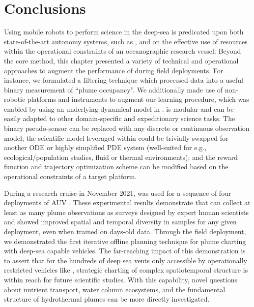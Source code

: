 \section{Conclusions}
\label{sec:field_conclusion}
Using mobile robots to perform science in the deep-sea is predicated upon both state-of-the-art autonomy systems, such as \PHORTEX, and on the effective use of resources within the operational constraints of an oceanographic research vessel. Beyond the core \PHORTEX method, this chapter presented a variety of technical and operational approaches to augment the performance of \PHORTEX during field deployments. For instance, we formulated a filtering technique which processed \Sentry data into a useful binary measurement of ``plume occupancy''. We additionally made use of non-robotic platforms and instruments to augment our learning procedure, which was enabled by using an underlying dynamical model in \PHUMES. \PHORTEX is modular and can be easily adapted to other domain-specific and expeditionary science tasks. The binary pseudo-sensor can be replaced with any discrete or continuous observation model; the scientific model leveraged within \PHUMES could be trivially swapped for another ODE or highly simplified PDE system (well-suited for e.g., ecological/population studies, fluid or thermal environments); and the reward function and trajectory optimization scheme can be modified based on the operational constraints of a target platform.

During a research cruise in November 2021, \PHORTEX was used for a sequence of four deployments of AUV \Sentry. These experimental results demonstrate that \PHORTEX can collect at least as many plume observations as surveys designed by expert human scientists and showed improved spatial and temporal diversity in samples for any given deployment, even when trained on days-old data. Through the field deployment, we demonstrated the first iterative offline planning technique for plume charting with deep-sea capable vehicles. The far-reaching impact of this demonstration is to assert that for the hundreds of deep sea vents only accessible by operationally restricted vehicles like \Sentry, strategic charting of complex spatiotemporal structure is within reach for future scientific studies. With this capability, novel questions about nutrient transport, water column ecosystems, and the fundamental structure of hydrothermal plumes can be more directly investigated.

 